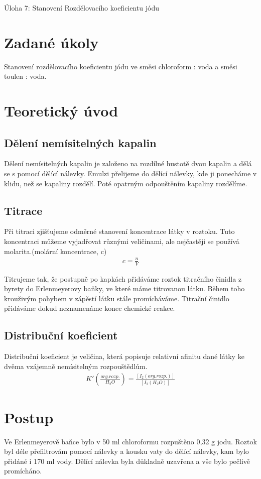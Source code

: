 \documentclass[13pt, a4paper, twoside]{article}
\begin{document}
\begin{center}
    \huge
    Úloha 7: Stanovení Rozdělovacího koeficientu jódu
    \vspace{7mm}
\end{center}
\onehalfspacing
\large \noindent
\section*{Zadané úkoly}
Stanovení rozdělovacího koeficientu jódu ve směsi chloroform : voda a směsi toulen : voda.
\section*{Teoretický úvod}
\subsection*{Dělení nemísitelných kapalin}
Dělení nemísitelných kapalin je založeno na rozdílné hustotě dvou kapalin a dělá se s pomocí dělící nálevky. Emulzi přelijeme do dělící nálevky, kde ji ponecháme v klidu, než se kapaliny rozdělí. Poté opatrným odpouštěním kapaliny rozdělíme.
\subsection*{Titrace}
Při titraci zjišťujeme odměrné stanovení koncentrace látky v roztoku. Tuto koncentraci můžeme vyjadřovat různými veličinami, ale nejčastěji se používá molarita.(molární koncentrace, c)
\begin{align*}
    c=\frac{n}{V}
\end{align*}

Titrujeme tak, že postupně po kapkách přidáváme roztok titračního činidla z byrety do Erlenmeyerovy baňky,  ve které máme titrovanou látku. Během toho krouživým pohybem v zápěstí látku stále promícháváme. Titrační činidlo přidáváme dokud neznamenáme konec chemické reakce.
\subsection*{Distribuční koeficient}
Distribuční koeficient je veličina, která popisuje relativní afinitu dané látky ke dvěma vzájemně nemísitelným rozpouštědlům.
\begin{align*}
    K'(\frac{org. rozp.}{H_2O}) = \frac{[I_2(org. rozp.)]}{[I_2(H_2O)]}
\end{align*}
\section*{Postup}
Ve Erlenmeyerově baňce bylo v 50 ml chloroformu rozpuštěno 0,32 g jodu. Roztok byl déle přefiltrovám pomocí nálevky a kousku vaty do dělící nálevky, kam bylo přidáné i 170 ml vody. Dělící nálevka byla důkladně uzavřena a vše bylo pečlivě promícháno. 
\end{document}
